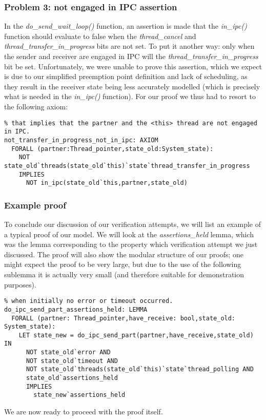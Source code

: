 \subsubsection{Problem 3: not engaged in IPC assertion}
In the \emph{do\_send\_wait\_loop()} function, an assertion is made that the \emph{in\_ipc()} function should evaluate to false when the \emph{thread\_cancel} and \emph{thread\_transfer\_in\_progress} bits are not set. To put it another way: only when the sender and receiver are engaged in IPC will the \emph{thread\_transfer\_in\_progress} bit be set. Unfortunately, we were unable to prove this assertion, which we expect is due to our simplified preemption point definition and lack of scheduling, as they result in the receiver state being less accurately modelled (which is precisely what is needed in the \emph{in\_ipc()} function). For our proof we thus had to resort to the following axiom:

\lstset{language=PVS}
\begin{lstlisting}[caption={PVS: the axiom used in the \emph{do\_send\_wait\_loop()} function.}]
% When the <thread_transfer_in_progress> bit of the <this> thread is not set,
% that implies that the partner and the <this> thread are not engaged in IPC.  
not_transfer_in_progress_not_in_ipc: AXIOM   
  FORALL (partner:Thread_pointer,state_old:System_state):
    NOT state_old`threads(state_old`this)`state`thread_transfer_in_progress
    IMPLIES 
      NOT in_ipc(state_old`this,partner,state_old)
\end{lstlisting}

\subsubsection{Example proof}
To conclude our discussion of our verification attempts, we will list an example of a typical proof of our model. We will look at the \emph{assertions\_held} lemma, which was the lemma corresponding to the property which verification attempt we just discussed. The proof will also show the modular structure of our proofs; one might expect the proof to be very large, but due to the use of the following sublemma it is actually very small (and therefore suitable for demonstration purposes).

\lstset{language=PVS}
\begin{lstlisting}[caption={PVS: property 3, sublemma for the  \emph{do\_ipc\_send\_part()} function.}]
% The various assertions in the code should hold after handling the send part
% when initially no error or timeout occurred.
do_ipc_send_part_assertions_held: LEMMA
  FORALL (partner: Thread_pointer,have_receive: bool,state_old: System_state):
    LET state_new = do_ipc_send_part(partner,have_receive,state_old) IN
      NOT state_old`error AND 
      NOT state_old`timeout AND
      NOT state_old`threads(state_old`this)`state`thread_polling AND
      state_old`assertions_held
      IMPLIES
        state_new`assertions_held
\end{lstlisting}

We are now ready to proceed with the proof itself.\emptyline

